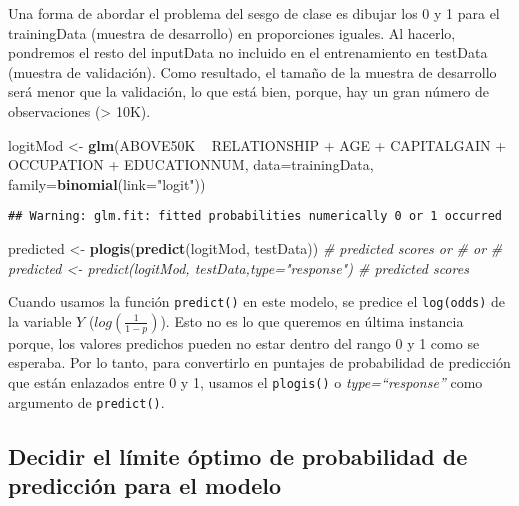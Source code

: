 \documentclass[]{article}
\newenvironment{Shaded}{\begin{snugshade}}{\end{snugshade}}
\newcommand{\KeywordTok}[1]{\textcolor[rgb]{0.13,0.29,0.53}{\textbf{{#1}}}}
\newcommand{\DataTypeTok}[1]{\textcolor[rgb]{0.13,0.29,0.53}{{#1}}}
\newcommand{\StringTok}[1]{\textcolor[rgb]{0.31,0.60,0.02}{{#1}}}
\newcommand{\CommentTok}[1]{\textcolor[rgb]{0.56,0.35,0.01}{\textit{{#1}}}}
\newcommand{\NormalTok}[1]{{#1}}
\numberwithin{equation}{section}
\begin{document}
Una forma de abordar el problema del sesgo de clase es dibujar los 0 y 1
para el trainingData (muestra de desarrollo) en proporciones iguales. Al
hacerlo, pondremos el resto del inputData no incluido en el
entrenamiento en testData (muestra de validación). Como resultado, el
tamaño de la muestra de desarrollo será menor que la validación, lo que
está bien, porque, hay un gran número de observaciones (\textgreater{}
10K).

\begin{Shaded}
\begin{Highlighting}[]
\NormalTok{logitMod <-}\StringTok{ }\KeywordTok{glm}\NormalTok{(ABOVE50K ~}\StringTok{ }\NormalTok{RELATIONSHIP +}\StringTok{ }\NormalTok{AGE +}\StringTok{ }\NormalTok{CAPITALGAIN }
                \NormalTok{+}\StringTok{ }\NormalTok{OCCUPATION +}\StringTok{ }\NormalTok{EDUCATIONNUM, }\DataTypeTok{data=}\NormalTok{trainingData, }
                \DataTypeTok{family=}\KeywordTok{binomial}\NormalTok{(}\DataTypeTok{link=}\StringTok{"logit"}\NormalTok{))}
\end{Highlighting}
\end{Shaded}

\begin{verbatim}
## Warning: glm.fit: fitted probabilities numerically 0 or 1 occurred
\end{verbatim}

\begin{Shaded}
\begin{Highlighting}[]
\NormalTok{predicted <-}\StringTok{ }\KeywordTok{plogis}\NormalTok{(}\KeywordTok{predict}\NormalTok{(logitMod, testData))  }\CommentTok{# predicted scores or}
\CommentTok{# or}
\CommentTok{# predicted <- predict(logitMod, testData,type="response")  # predicted scores}
\end{Highlighting}
\end{Shaded}

Cuando usamos la función \texttt{predict()} en este modelo, se predice
el \texttt{log(odds)} de la variable \(Y\) (\(log(\frac{1}{1-p})\)).
Esto no es lo que queremos en última instancia porque, los valores
predichos pueden no estar dentro del rango 0 y 1 como se esperaba. Por
lo tanto, para convertirlo en puntajes de probabilidad de predicción que
están enlazados entre 0 y 1, usamos el \texttt{plogis()} o
\emph{type=``response''} como argumento de \texttt{predict()}.

\subsection{Decidir el límite óptimo de probabilidad de predicción para
el
modelo}\label{decidir-el-limite-optimo-de-probabilidad-de-prediccion-para-el-modelo}
\end{document}
